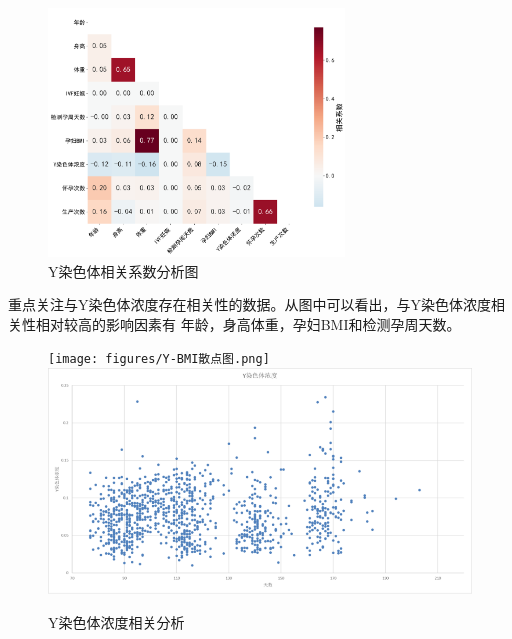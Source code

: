 \documentclass[withoutpreface,notoc]{cumcmthesis}
\begin{document}
	\begin{figure}[ht]
		\centering
		\includegraphics[width=0.7\textwidth]{figures/spearman5.png} 
		\caption{Y染色体相关系数分析图}
		\label{Y染色体相关系数}
	\end{figure}
	重点关注与Y染色体浓度存在相关性的数据。从图中可以看出，与Y染色体浓度相关性相对较高的影响因素有
	年龄，身高体重，孕妇BMI和检测孕周天数。




	\begin{figure}[H]
		\centering
		{\texttt{[image: figures/Y-BMI散点图.png]}}
		\hfill %
		{\includegraphics[width=.45\textwidth]{figures/Y-天数散点.png}}
		\caption{Y染色体浓度相关分析}
		\label{fig:Y染色体浓度与其他数据}
	\end{figure}
\end{document}
